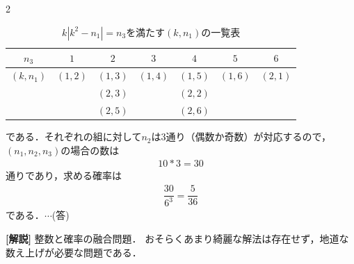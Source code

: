 \documentclass[../../main.tex]{subfiles}
\begin{document}
\begin{multicols}{2}
  \begin{table}[H]
    \centering
    \caption{$k|k^2-n_1|=n_3$を満たす$(k,n_1)$の一覧表}
    \begin{tabular}{|c||c|c|c|c|c|c|}
      \hline
      $n_3$      & $1$     & $2$     & $3$     & $4$     & $5$     & $6$     \\
      \hline
      $(k, n_1)$ & $(1,2)$ & $(1,3)$ & $(1,4)$ & $(1,5)$ & $(1,6)$ & $(2,1)$ \\
      &         & $(2,3)$ &         & $(2,2)$ &         &         \\
      &         & $(2,5)$ &         & $(2,6)$ &         &         \\
      \hline
    \end{tabular}
  \end{table}
  である．それぞれの組に対して$n_2$は3通り（偶数か奇数）が対応するので，$(n_1,n_2,n_3)$の場合の数は
  \begin{align}
    10*3 = 30
  \end{align}
  通りであり，求める確率は
  \begin{align}
    \dfrac{30}{6^3} = \dfrac{5}{36}
  \end{align}
  である．$\cdots$(答)

  {\bf [解説]}
  整数と確率の融合問題．
  おそらくあまり綺麗な解法は存在せず，地道な数え上げが必要な問題である．

  \newpage
\end{multicols}
\end{document}
